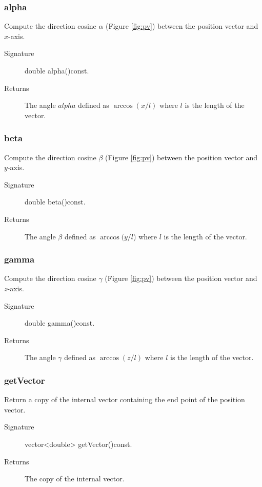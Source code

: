 \subsubsection{alpha} 
Compute the direction cosine $\alpha$ (Figure \ref{fig:pv}) between the position 
vector and $x$-axis.
  \begin{description}
       \item [Signature] double alpha()const.
       \item [Returns] The angle $alpha$  defined as $\arccos (x / l)$
                       where $l$ is the length of the vector.
   
  \end{description} 

\subsubsection{beta} 
Compute the direction cosine $\beta$ (Figure \ref{fig:pv}) between the position 
vector and $y$-axis.
  \begin{description}
        \item [Signature] double beta()const.
       \item [Returns] The angle $\beta$  defined as $\arccos (y / l$)
                       where $l$ is the length of the vector. 
  \end{description} 

\subsubsection{gamma}
Compute the direction cosine $\gamma$ (Figure \ref{fig:pv}) between the position 
vector and $z$-axis.
  \begin{description}
       \item [Signature] double gamma()const.
       \item [Returns] The angle $\gamma$ defined as $\arccos (z / l)$
                       where $l$ is the length of the vector.
  \end{description} 

 
\subsubsection{getVector} 
Return a copy of the internal vector containing the end point 
of the position vector. 
  \begin{description}
       \item [Signature] vector<double> getVector()const.
       \item [Returns] The copy of the internal vector. 
  \end{description} 


